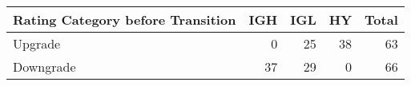 \begin{tabular}{lrrrr}
\toprule
Rating Category before Transition & IGH & IGL & HY & Total \\
\midrule
Upgrade & 0 & 25 & 38 & 63 \\
Downgrade & 37 & 29 & 0 & 66 \\
\bottomrule
\end{tabular}
